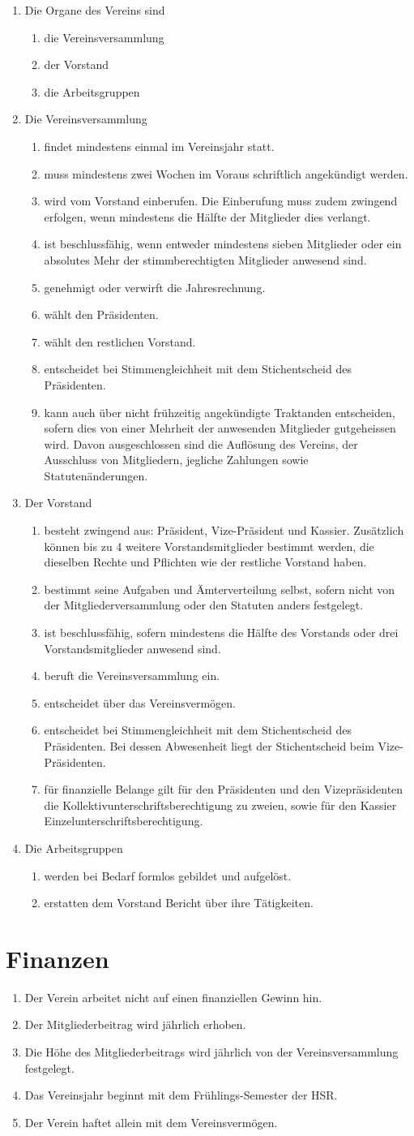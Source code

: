 \documentclass[10pt,a4paper,parskip,fleqn]{scrartcl}
\newcommand{\ol}{\begin{enumerate}[itemsep=-0.2em,topsep=-0.2em]}
\newcommand{\lo}{\end{enumerate}}
\newcommand{\li}{\item}
\begin{document}
\ol
  \li Die Organe des Vereins sind
    \ol
      \li die Vereinsversammlung
      \li der Vorstand
      \li die Arbeitsgruppen
    \lo
  \li Die Vereinsversammlung
    \ol
      \li findet mindestens einmal im Vereinsjahr statt.
      \li muss mindestens zwei Wochen im Voraus schriftlich angekündigt werden.
      \li wird vom Vorstand einberufen. Die Einberufung muss zudem zwingend
      erfolgen, wenn mindestens die Hälfte der Mitglieder dies verlangt.
      \li ist beschlussfähig, wenn entweder mindestens sieben Mitglieder oder
      ein absolutes Mehr der stimmberechtigten Mitglieder anwesend sind.
      \li genehmigt oder verwirft die Jahresrechnung.
      \li wählt den Präsidenten.
      \li wählt den restlichen Vorstand.
      \li entscheidet bei Stimmengleichheit mit dem Stichentscheid des
      Präsidenten.
      \li kann auch über nicht frühzeitig angekündigte Traktanden entscheiden,
      sofern dies von einer Mehrheit der anwesenden Mitglieder gutgeheissen
      wird.  Davon ausgeschlossen sind die Auflösung des Vereins, der Ausschluss
      von Mitgliedern, jegliche Zahlungen sowie Statutenänderungen.
    \lo
  \li Der Vorstand
    \ol
      \li besteht zwingend aus: Präsident, Vize-Präsident und Kassier.
      Zusätzlich können bis zu 4 weitere Vorstandsmitglieder bestimmt werden,
      die dieselben Rechte und Pflichten wie der restliche Vorstand haben.
      \li bestimmt seine Aufgaben und Ämterverteilung selbst, sofern nicht von
      der Mitgliederversammlung oder den Statuten anders festgelegt.
      \li ist beschlussfähig, sofern mindestens die Hälfte des Vorstands oder
      drei Vorstandsmitglieder anwesend sind.
      \li beruft die Vereinsversammlung ein.
      \li entscheidet über das Vereinsvermögen.
      \li entscheidet bei Stimmengleichheit mit dem Stichentscheid des
      Präsidenten. Bei dessen Abwesenheit liegt der Stichentscheid beim
      Vize-Präsidenten.
      \li für finanzielle Belange gilt für den Präsidenten und den
      Vizepräsidenten die Kollektiv\-unterschriftsberechtigung zu zweien, sowie
      für den Kassier Einzelunterschriftsberechtigung.
    \lo
  \li Die Arbeitsgruppen
    \ol
      \li werden bei Bedarf formlos gebildet und aufgelöst.
      \li erstatten dem Vorstand Bericht über ihre Tätigkeiten.
    \lo
\lo


\section{Finanzen}

\ol
  \li Der Verein arbeitet nicht auf einen finanziellen Gewinn hin.
  \li Der Mitgliederbeitrag wird jährlich erhoben.
  \li Die Höhe des Mitgliederbeitrags wird jährlich von der Vereinsversammlung
  festgelegt.
  \li Das Vereinsjahr beginnt mit dem Frühlings-Semester der HSR.
  \li Der Verein haftet allein mit dem Vereinsvermögen.
\lo
\end{document}
